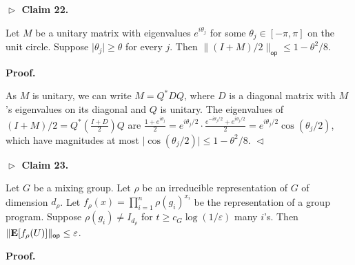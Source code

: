 

\par\medskip\noindent\textbf{
$\vartriangleright$ Claim 22. }\par



Let $M$ be a unitary matrix with eigenvalues $e^{i\theta_{j}}$ for some $\theta_{j}\in[-\pi,\pi]$ on the unit circle.
Suppose $\lvert\theta_{j}\rvert\geq\theta$ for every $j$. Then $\lVert(I+M)/2\rVert_{\mathsf{op}}\leq 1-\theta^{2}/8$.\par






\par\medskip\noindent\textbf{
\textbf{Proof}.}\par




As $M$ is unitary, we can write $M=Q^{\ast}DQ$, where $D$ is a diagonal matrix with $M$’s eigenvalues on its diagonal and $Q$ is unitary.
The eigenvalues of $(I+M)/2=Q^{\ast}(\frac{I+D}{2})Q$ are $\frac{1+e^{i\theta_{j}}}{2}=e^{i\theta_{j}/2}\cdot\frac{e^{-i\theta_{j}/2}+e^{i\theta_{j}/2}}{2}=e^{i\theta_{j}/2}\cos(\theta_{j}/2)$, which have magnitudes at most $\lvert\cos(\theta_{j}/2)\rvert\leq 1-\theta^{2}/8$.
$\vartriangleleft$\par





\par\medskip\noindent\textbf{
$\vartriangleright$ Claim 23. }\par



Let $G$ be a mixing group.
Let $\rho$ be an irreducible representation of $G$ of dimension $d_{\rho}$.
Let $f_{\rho}(x)=\prod_{i=1}^{n}\rho(g_{i})^{x_{i}}$ be the representation of a group program.
Suppose $\rho(g_{i})\neq I_{d_{\rho}}$ for $t\geq c_{G}\log(1/\varepsilon)$ many $i$’s.
Then $\lVert\mathop{\bf E\/}[f_{\rho}(U)]\rVert_{\mathsf{op}}\leq\varepsilon$.\par







\par\medskip\noindent\textbf{
\textbf{Proof}.}\par




